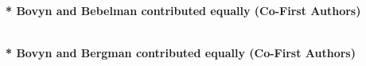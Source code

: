 \documentclass[letterpaper,10pt]{article} %
\begin{document}
\begin{description}[itemsep=-1ex]
\item {}
\\ \textbf{\** Bovyn and Bebelman contributed equally (Co-First Authors)}
\item {}
\item {}
\item {}
\item {}
\item {}
\item {}
\item {} \\ \textbf{\** Bovyn and Bergman contributed equally (Co-First Authors)}
\item {}
\item {}

%
%
%
%
%

\end{description}
\end{document}
